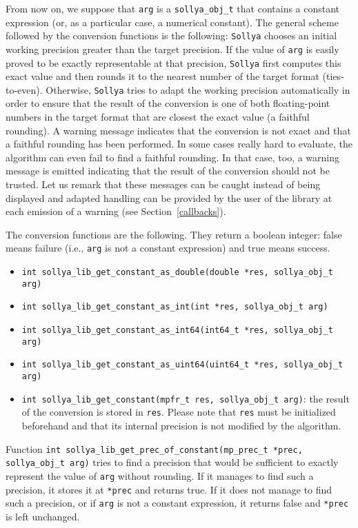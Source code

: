 \documentclass[a4paper]{article}
\newcommand{\sollya}{\texttt{Sollya}\xspace}
\begin{document}
From now on, we suppose that \verb|arg| is a \verb|sollya_obj_t| that contains a constant expression (or, as a particular case, a numerical constant). The general scheme followed by the conversion functions is the following: \sollya chooses an initial working precision greater than the target precision. If the value of \verb|arg| is easily proved to be exactly representable at that precision, \sollya first computes this exact value and then rounds it to the nearest number of the target format (ties-to-even). Otherwise, \sollya tries to adapt the working precision automatically in order to ensure that the result of the conversion is one of both floating-point numbers in the target format that are closest the exact value (a faithful rounding). A warning message indicates that the conversion is not exact and that a faithful rounding has been performed. In some cases really hard to evaluate, the algorithm can even fail to find a faithful rounding. In that case, too, a warning message is emitted indicating that the result of the conversion should not be trusted. Let us remark that these messages can be caught instead of being displayed and adapted handling can be provided by the user of the library at each emission of a warning (see Section~\ref{callbacks}).

The conversion functions are the following. They return a boolean integer: false means failure (i.e., \verb|arg| is not a constant expression) and true means success.
\begin{itemize}
\item \verb|int sollya_lib_get_constant_as_double(double *res, sollya_obj_t arg)|
\item \verb|int sollya_lib_get_constant_as_int(int *res, sollya_obj_t arg)|
\item \verb|int sollya_lib_get_constant_as_int64(int64_t *res, sollya_obj_t arg)|
\item \verb|int sollya_lib_get_constant_as_uint64(uint64_t *res, sollya_obj_t arg)|
\item \verb|int sollya_lib_get_constant(mpfr_t res, sollya_obj_t arg)|: the result of the conversion is stored in \verb|res|. Please note that \verb|res| must be initialized beforehand and that its internal precision is not modified by the algorithm.
\end{itemize}

Function  \verb|int sollya_lib_get_prec_of_constant(mp_prec_t *prec, sollya_obj_t arg)| tries to find a precision that would be sufficient to exactly represent the value of \verb|arg| without rounding. If it manages to find such a precision, it stores it at \verb|*prec| and returns true. If it does not manage to find such a precision, or if \verb|arg| is not a constant expression, it returns false and \verb|*prec| is left unchanged.
\end{document}
